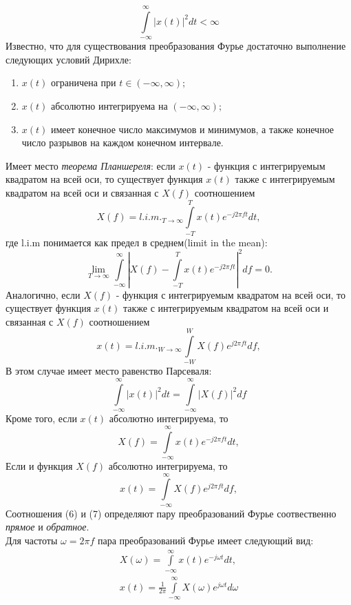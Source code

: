 $$
\int\limits_{-\infty}^{\infty}|x(t)|^2dt < \infty 
$$
\indent Известно, что для существования преобразования Фурье достаточно выполнение следующих условий Дирихле:


\begin{enumerate}%
	\renewcommand{\theenumi}{(\asbuk{enumi})}
	\renewcommand{\labelenumi}{\asbuk{enumi})}
	\item $x(t)$ ограничена при $t\in(-\infty,\infty);$
	\item $x(t)$ абсолютно интегрируема на $(-\infty,\infty);$
	\item $x(t)$ имеет конечное число максимумов и минимумов, а также конечное число разрывов на каждом конечном интервале.
\end{enumerate}
\indent Имеет место {\it теорема Планшереля}: если $x(t)$ - функция с интегрируемым квадратом на всей оси, то существует  функция $x(t)$ также с интегрируемым квадратом на всей оси и связанная с $X(f)$ соотношением
$$
X(f) = l.i.m._{T\to\infty} \int\limits_{-T}^{T}x(t)e^{-j2 \pi ft}dt, 
$$
где l.i.m понимается как предел в среднем(limit in the mean):
$$
\lim_{T\to\infty}  \int\limits_{-\infty}^{\infty}\left|X(f)- \int\limits_{-T}^{T}x(t)e^{-j2 \pi ft}\right|^2df = 0. 
$$
\indent Аналогично, если $X(f)$ - функция с интегрируемым квадратом на всей оси, то существует функция $x(t)$ также с интегрируемым квадратом на всей оси и связанная с $X(f)$ соотношением
$$
x(t) = l.i.m._{W\to\infty} \int\limits_{-W}^{W}X(f)e^{j2 \pi ft}df, 
$$
В этом случае имеет место равенство Парсеваля:
$$
\int\limits_{-\infty}^{\infty}|x(t)|^2dt = \int\limits_{-\infty}^{\infty}|X(f)|^2df  
$$
Кроме того, если $x(t)$ абсолютно интегрируема, то
$$
X(f) = \int\limits_{-\infty}^{\infty}x(t)e^{-j2 \pi ft}dt, 
$$
Если и функция $X(f)$ абсолютно интегрируема, то
$$
x(t) = \int\limits_{-\infty}^{\infty}X(f)e^{j2 \pi ft}df, 
$$
Соотношения (6) и (7) определяют пару преобразований Фурье соотвественно {\it прямое} и {\it обратное}.
\\\indent Для частоты $\omega = 2 \pi f$ пара преобразований Фурье имеет следующий вид:
\begin{gather}
  X(\omega) = \int\limits_{-\infty}^{\infty}x(t)e^{-j\omega t}dt, \\ 
  x(t) = \frac{1}{2\pi} \int\limits_{-\infty}^{\infty}X(\omega)e^{j\omega t}d\omega
\end{gather}
